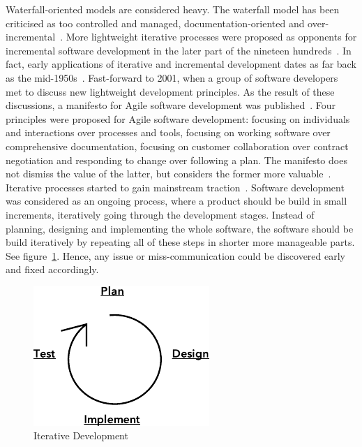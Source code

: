 \documentclass[english]{tktltiki2}
\begin{document}
Waterfall-oriented models are considered heavy. The waterfall model has been criticised as too controlled and managed, documentation-oriented and over-incremental~\cite{Boe88, LB03}. More lightweight iterative processes were proposed as opponents for incremental software development in the later part of the nineteen hundreds~\cite{LB03}. In fact, early applications of iterative and incremental development dates as far back as the mid-1950s~\cite{LB03}. Fast-forward to 2001, when a group of software developers met to discuss new lightweight development principles. As the result of these discussions, a manifesto for Agile software development was published~\cite{BBB01a}. Four principles were proposed for Agile software development: focusing on individuals and interactions over processes and tools, focusing on working software over comprehensive documentation, focusing on customer collaboration over contract negotiation and responding to change over following a plan. The manifesto does not dismiss the value of the latter, but considers the former more valuable~\cite{BBB01a}. Iterative processes started to gain mainstream traction~\cite{LB03}. Software development was considered as an ongoing process, where a product should be build in small increments, iteratively going through the development stages. Instead of planning, designing and implementing the whole software, the software should be build iteratively by repeating all of these steps in shorter more manageable parts. See figure~\ref{figure:iterative-development}. Hence, any issue or miss-communication could be discovered early and fixed accordingly.

\begin{figure}[h!]

    \vspace{1cm}
    \centering

    \includegraphics{figures/iterative-development}

    \caption{Iterative Development}
    \label{figure:iterative-development}

\end{figure}
\end{document}
